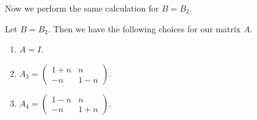 Now we perform the same calculation for $B = B_2$.
\begin{prop}
    Let $B = B_2$. Then we have the following choices for our matrix $A$.
    \begin{enumerate}
        \item $A = I$.
        \item $A_3 = \begin{pmatrix}
                      1+n & n   \\
                      -n  & 1-n
                  \end{pmatrix}$.
        \item $A_4 = \begin{pmatrix}
                      1-n & n   \\
                      -n  & 1+n
                  \end{pmatrix}$.
    \end{enumerate}
\end{prop}
